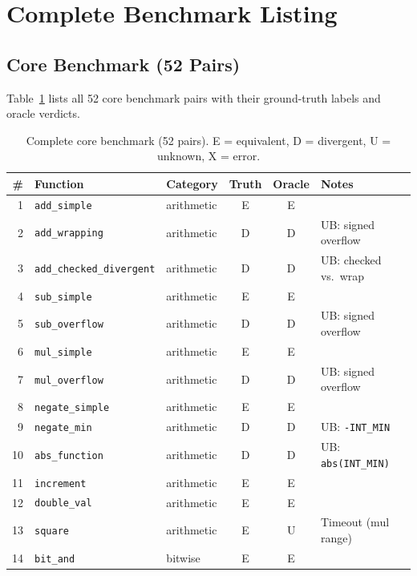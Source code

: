 \documentclass[11pt]{article}
\begin{document}
\section{Complete Benchmark Listing}\label{app:benchmark}

\subsection{Core Benchmark (52 Pairs)}

Table~\ref{tab:core52} lists all 52 core benchmark pairs with their
ground-truth labels and oracle verdicts.

\begin{table}[H]
\centering
\small
\caption{Complete core benchmark (52 pairs).  E = equivalent,
         D = divergent, U = unknown, X = error.}\label{tab:core52}
\begin{tabular}{@{}rllccl@{}}
\toprule
\textbf{\#} & \textbf{Function} & \textbf{Category} & \textbf{Truth} & \textbf{Oracle} & \textbf{Notes} \\
\midrule
1  & \texttt{add\_simple}        & arithmetic & E & E & \\
2  & \texttt{add\_wrapping}      & arithmetic & D & D & UB: signed overflow \\
3  & \texttt{add\_checked\_divergent} & arithmetic & D & D & UB: checked vs.\ wrap \\
4  & \texttt{sub\_simple}        & arithmetic & E & E & \\
5  & \texttt{sub\_overflow}      & arithmetic & D & D & UB: signed overflow \\
6  & \texttt{mul\_simple}        & arithmetic & E & E & \\
7  & \texttt{mul\_overflow}      & arithmetic & D & D & UB: signed overflow \\
8  & \texttt{negate\_simple}     & arithmetic & E & E & \\
9  & \texttt{negate\_min}        & arithmetic & D & D & UB: \texttt{-INT\_MIN} \\
10 & \texttt{abs\_function}      & arithmetic & D & D & UB: \texttt{abs(INT\_MIN)} \\
11 & \texttt{increment}          & arithmetic & E & E & \\
12 & \texttt{double\_val}        & arithmetic & E & E & \\
13 & \texttt{square}             & arithmetic & E & U & Timeout (mul range) \\
14 & \texttt{bit\_and}           & bitwise & E & E & \\

\end{tabular}
\end{table}
\end{document}
